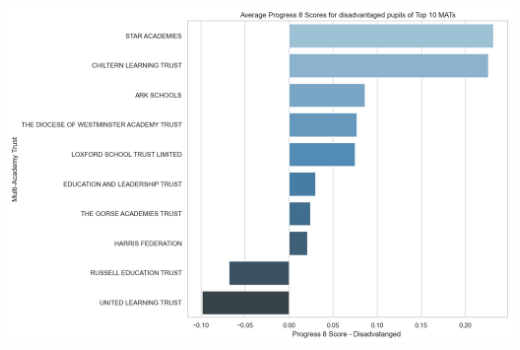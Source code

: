\documentclass[
  letterpaper,
  DIV=11,
  numbers=noendperiod]{scrartcl}
\begin{document}
\includegraphics{P4DS_A2_Data_Analysis_Project_files/figure-pdf/cell-99-output-2.png}
\end{document}
